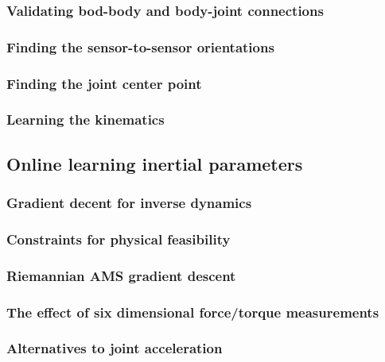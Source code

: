 \documentclass{article}
\begin{document}
\subsubsection{Validating bod-body and body-joint connections}
\subsubsection{Finding the sensor-to-sensor orientations}
\subsubsection{Finding the joint center point}
\subsubsection{Learning the kinematics}
\subsection{Online learning inertial parameters}
\subsubsection{Gradient decent for inverse dynamics}
\subsubsection{Constraints for physical feasibility}
\subsubsection{Riemannian AMS gradient descent}
\subsubsection{The effect of six dimensional force/torque measurements}
\subsubsection{Alternatives to joint acceleration}

\end{document}
